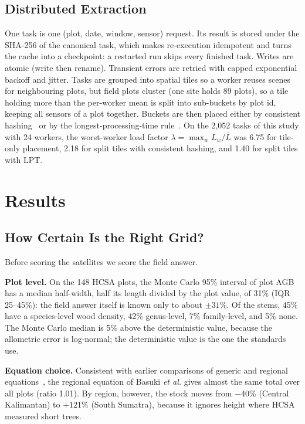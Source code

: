 \documentclass[conference,a4paper]{IEEEtran}
\begin{document}
\subsection{Distributed Extraction}
One task is one (plot, date, window, sensor) request. Its result is stored under the SHA-256 of the canonical task, which makes re-execution idempotent and turns the cache into a checkpoint: a restarted run skips every finished task. Writes are atomic (write then rename). Transient errors are retried with capped exponential backoff and jitter. Tasks are grouped into spatial tiles so a worker reuses scenes for neighbouring plots, but field plots cluster (one site holds 89 plots), so a tile holding more than the per-worker mean is split into sub-buckets by plot id, keeping all sensors of a plot together. Buckets are then placed either by consistent hashing~\cite{karger1997consistent} or by the longest-processing-time rule~\cite{graham1969bounds}. On the 2{,}052 tasks of this study with 24 workers, the worst-worker load factor $\lambda=\max_w L_w/\bar L$ was 6.75 for tile-only placement, 2.18 for split tiles with consistent hashing, and 1.40 for split tiles with LPT.

\section{Results}

\subsection{How Certain Is the Right Grid?}
Before scoring the satellites we score the field answer.

\textbf{Plot level.} On the 148 HCSA plots, the Monte Carlo 95\% interval of plot AGB has a median half-width, half its length divided by the plot value, of 31\% (IQR 25--45\%): the field answer itself is known only to about $\pm31$\%. Of the stems, 45\% have a species-level wood density, 42\% genus-level, 7\% family-level, and 5\% none. The Monte Carlo median is 5\% above the deterministic value, because the allometric error is log-normal; the deterministic value is the one the standards use.

\textbf{Equation choice.} Consistent with earlier comparisons of generic and regional equations~\cite{rutishauser2013generic}, the regional equation of Basuki \textit{et al.} gives almost the same total over all plots (ratio 1.01). By region, however, the stock moves from $-40$\% (Central Kalimantan) to $+121$\% (South Sumatra), because it ignores height where HCSA measured short trees.
\end{document}
